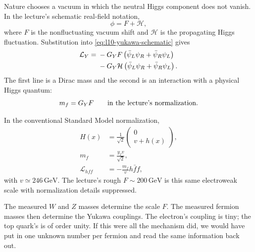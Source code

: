 Nature chooses a vacuum in which the neutral Higgs component does not
vanish. In the lecture's schematic real-field notation,
\begin{equation}
  \phi=F+\mathcal H ,
  \label{eq:l10-f-plus-h}
\end{equation}
where \(F\) is the nonfluctuating vacuum shift and \(\mathcal H\) is the
propagating Higgs fluctuation. Substitution into
\eqref{eq:l10-yukawa-schematic} gives
\begin{align}
  \mathcal L_Y
  ={}&
  -G_YF
  \left(\bar\psi_L\psi_R+\bar\psi_R\psi_L\right)
  \notag\\
  &-G_Y\mathcal H
  \left(\bar\psi_L\psi_R+\bar\psi_R\psi_L\right).
  \label{eq:l10-yukawa-split}
\end{align}
The first line is a Dirac mass and the second is an interaction with a
physical Higgs quantum:
\begin{equation}
  m_f=G_YF
  \qquad\hbox{in the lecture's normalization.}
  \label{eq:l10-mass-lecture-normalization}
\end{equation}

In the conventional Standard Model normalization,
\begin{equation}
\begin{aligned}
  H(x)&=\frac{1}{\sqrt2}
  \begin{pmatrix}
    0\\ v+h(x)
  \end{pmatrix},
  \\
  m_f&=\frac{y_fv}{\sqrt2},
  \\
  \mathcal L_{hff}&=-\frac{m_f}{v}h\bar f f,
\end{aligned}
  \label{eq:l10-standard-higgs-normalization}
\end{equation}
with \(v\simeq246\,\mathrm{GeV}\). The lecture's rough
\(F\sim200\,\mathrm{GeV}\) is this same electroweak scale with normalization
details suppressed.

The measured \(W\) and \(Z\) masses determine the scale \(F\). The measured
fermion masses then determine the Yukawa couplings. The electron's coupling
is tiny; the top quark's is of order unity. If this were all the mechanism
did, we would have put in one unknown number per fermion and read the same
information back out.

